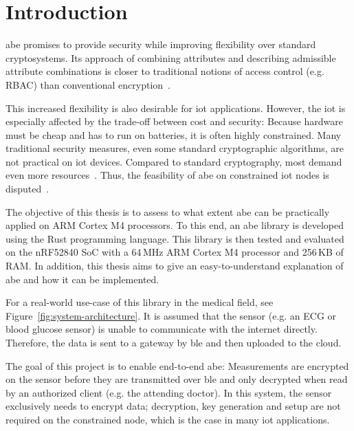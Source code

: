 
\chapter{Introduction}\label{chapter:introduction}

\acrfull{abe} promises to provide security while improving flexibility over standard cryptosystems.
Its approach of combining \glspl{attribute} and  describing admissible attribute combinations is closer to traditional notions of access control (e.g. RBAC) than conventional encryption~\cite{bethencourt_ciphertext-policy_2007}.

This increased flexibility is also desirable for \acrshort{iot} applications.
However, the \acrfull{iot} is especially affected by the trade-off between cost and security:
Because hardware must be cheap and has to run on batteries, it is often highly constrained.
Many traditional security measures, even some standard cryptographic algorithms, are not practical on \acrshort{iot} devices.
Compared to standard cryptography, most  demand even more resources~\cite{wang_performance_2014}.
Thus, the feasibility of \acrshort{abe} on constrained \acrshort{iot} nodes is disputed~\cite{ambrosin_feasibility_2016,ambrosin_feasibility_2015,borgh_attribute-based_2016,girgenti_feasibility_2019,wang_performance_2014}.

The objective of this thesis is to assess to what extent \acrshort{abe} can be practically applied on ARM Cortex M4 processors.
To this end, an \acrshort{abe} library is developed using the Rust programming language.
This library is then tested and evaluated on the nRF52840 SoC with a 64\,MHz ARM Cortex M4 processor and 256\,KB of RAM.
In addition, this thesis aims to give an easy-to-understand explanation of \acrshort{abe} and how it can be implemented.



For a real-world use-case of this library in the medical field, see Figure~\ref{fig:system-architecture}.
It is assumed that the sensor (e.g. an ECG or blood glucose sensor) is unable to communicate with the internet directly.
Therefore, the data is sent to a gateway by \acrfull{ble} and then uploaded to the cloud.

The goal of this project is to enable end-to-end \acrlong{abe}:
Measurements are encrypted on the sensor before they are transmitted over \acrshort{ble} and only decrypted when read by an authorized client (e.g. the attending doctor).
In this system, the sensor exclusively needs to encrypt data; decryption, key generation and setup are not required on the constrained node, which is the case in many \acrshort{iot} applications.

